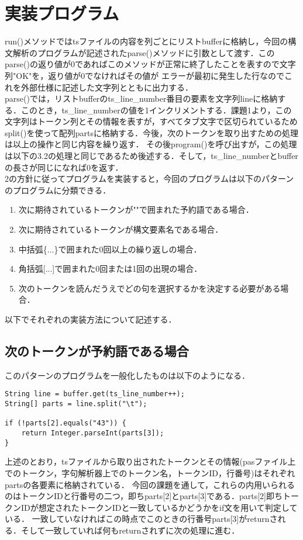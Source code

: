\documentclass[dvipdfmx]{jarticle}
\begin{document}
\section{実装プログラム}
run()メソッドではtsファイルの内容を列ごとにリストbufferに格納し，今回の構文解析のプログラムが記述されたparse()メソッドに引数として渡す．このparse()の返り値が0であればこのメソッドが正常に終了したことを表すので文字列"OK"を，返り値が0でなければその値が
エラーが最初に発生した行なのでこれを外部仕様に記述した文字列とともに出力する．\\
parse()では，リストbufferのts\_line\_number番目の要素を文字列lineに格納する．このとき，ts\_line\_numberの値を1インクリメントする．課題1より，この文字列はトークン列とその情報を表すが，すべてタブ文字で区切られているため
split()を使って配列partsに格納する．今後，次のトークンを取り出すための処理は以上の操作と同じ内容を繰り返す．
その後program()を呼び出すが，この処理は以下の3.2の処理と同じであるため後述する．そして，ts\_line\_numberとbufferの長さが同じになれば0を返す．
\\2の方針に従ってプログラムを実装すると，今回のプログラムは以下のパターンのプログラムに分類できる．
\begin{enumerate}
  \item 次に期待されているトークンが""で囲まれた予約語である場合．
  \item 次に期待されているトークンが構文要素名である場合．
  \item 中括弧\{...\}で囲まれた0回以上の繰り返しの場合．
  \item 角括弧[...]で囲まれた0回または1回の出現の場合．
  \item 次のトークンを読んだうえでどの句を選択するかを決定する必要がある場合．
\end{enumerate}
以下でそれぞれの実装方法について記述する．
\subsection{次のトークンが予約語である場合}
このパターンのプログラムを一般化したものは以下のようになる．
\begin{lstlisting}
String line = buffer.get(ts_line_number++);
String[] parts = line.split("\t");

if (!parts[2].equals("43")) {
    return Integer.parseInt(parts[3]); 
}
\end{lstlisting}
上述のとおり，tsファイルから取り出されたトークンとその情報(pasファイル上でのトークン，字句解析器上でのトークン名，トークンID，行番号)はそれぞれpartsの各要素に格納されている．
今回の課題を通して，これらの内用いられるのはトークンIDと行番号の二つ，即ちparts[2]とparts[3]である．parts[2]即ちトークンIDが想定されたトークンIDと一致しているかどうかをif文を用いて判定している．
一致していなければこの時点でこのときの行番号parts[3]がreturnされる．そして一致していれば何もreturnされずに次の処理に進む．
\end{document}
